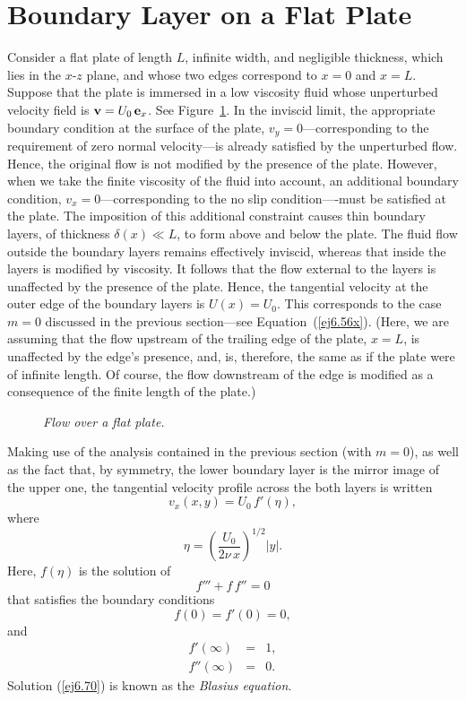 \section{Boundary Layer on a Flat Plate}\label{splate}
Consider a  flat plate of length $L$, infinite width, and  negligible thickness, which lies in the $x$-$z$ plane, and whose
two  edges correspond to $x=0$ and $x=L$. Suppose that  the plate is immersed in a low viscosity fluid whose unperturbed velocity field is ${\bf v}= U_0\,{\bf e}_x$. See Figure~\ref{fplate}. In the inviscid limit, the appropriate boundary condition at the
surface of the plate, $v_y=0$---corresponding to the requirement of zero normal velocity---is already satisfied by the unperturbed flow. Hence, the original flow is not modified
by the presence of the plate. However, when we take the finite viscosity of the fluid into account, an additional boundary
condition, $v_x=0$---corresponding to the no slip condition----must be satisfied at the plate. The
imposition of this additional constraint causes thin boundary layers, of thickness $\delta(x)\ll L$, to form above and below the
plate. The fluid flow outside the boundary layers remains effectively inviscid, whereas that inside the
layers is modified by viscosity. It follows that the flow external to the layers is unaffected by the presence of the
plate. Hence, the tangential velocity at the outer edge of the boundary layers is $U(x) = U_0$. This corresponds
to the case $m=0$ discussed in the previous section---see Equation~(\ref{ej6.56x}). (Here, we are assuming that the flow upstream of the
trailing edge of the plate, $x=L$, is unaffected by the edge's presence, and, is, therefore, the same as if the plate were 
of infinite length. Of course, the flow downstream of the edge is modified as a consequence of the finite length of the plate.)

\begin{figure}
\epsfysize=2.5in
\centerline{}
\caption{\em Flow over a flat plate. }\label{fplate}
\end{figure}

Making use of the analysis contained in the previous section (with $m=0$), as well as the
fact that, by symmetry, the lower boundary layer is the mirror image of the upper one, the tangential velocity
profile across the both layers is written
\begin{equation}
v_x(x,y) = U_0\,f'(\eta),
\end{equation}
where
\begin{equation}
\eta = \left(\frac{U_0}{2\nu\,x}\right)^{1/2} |y|.
\end{equation}
Here, $f(\eta)$ is the solution of 
\begin{equation}\label{ej6.70}
f''' + f\,f'' = 0
\end{equation}
that satisfies the boundary conditions
\begin{equation}
f(0)=f'(0)= 0,\label{ej6.71}
\end{equation}
and
\begin{eqnarray}
f'(\infty)&=&1,\\[0.5ex]
f''(\infty) &=&0.\label{ej6.73}
\end{eqnarray}
Solution (\ref{ej6.70}) is known as the {\em Blasius equation}. 

